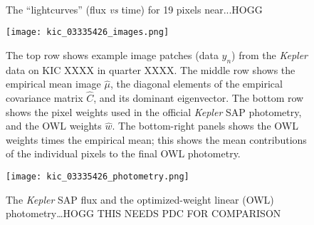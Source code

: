 \documentclass[12pt, letterpaper, preprint]{aastex}
\newcommand{\project}[1]{\textsl{#1}}
\newcommand{\foreign}[1]{\textsl{#1}}
\begin{document}
\clearpage
\begin{figure}
~ %
\caption{
The ``lightcurves'' (flux \foreign{vs} time) for 19 pixels near...HOGG
\label{fig:pixels}}
\end{figure}

\clearpage
\begin{figure}
\texttt{[image: kic\_03335426\_images.png]}
\caption{
The top row shows example image patches (data $y_n$) from the \project{Kepler} data on KIC XXXX in quarter XXXX.
The middle row shows the empirical mean image $\hat{\mu}$,
  the diagonal elements of the empirical covariance matrix $\hat{C}$,
  and its dominant eigenvector.
The bottom row shows the pixel weights used in the official \project{Kepler} SAP photometry,
  and the OWL weights $\hat{w}$.
The bottom-right panels shows the OWL weights times the empirical mean;
  this shows the mean contributions of the individual pixels to the final OWL photometry.
\label{fig:images}}
\end{figure}

\clearpage
\begin{figure}
\texttt{[image: kic\_03335426\_photometry.png]}
\caption{
The \project{Kepler} SAP flux
  and the optimized-weight linear (OWL) photometry\ldots HOGG THIS NEEDS PDC FOR COMPARISON
\label{fig:results}}
\end{figure}
\end{document}

